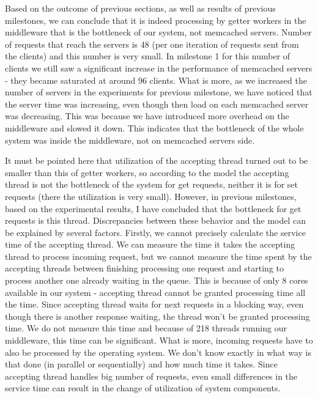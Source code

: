 \documentclass[11pt]{article}
\begin{document}
Based on the outcome of previous sections, as well as results of previous milestones, we can conclude that it is indeed processing by getter workers in the middleware that is the bottleneck of our system, not memcached servers. Number of requests that reach the servers is 48 (per one iteration of requests sent from the clients) and this number is very small. In milestone 1 for this number of clients we still saw a significant increase in the performance of memcached servers - they became saturated at around 96 clients. What is more, as we increased the number of servers in the experiments for previous milestone, we have noticed that the server time was increasing, even though then load on each memcached server was decreasing. This was because we have introduced more overhead on the middleware and slowed it down. This indicates that the bottleneck of the whole system was inside the middleware, not on memcached servers side.

It must be pointed here that utilization of the accepting thread turned out to be smaller than this of getter workers, so according to the model the accepting thread is not the bottleneck of the system for get requests, neither it is for set requests (there the utilization is very small). However, in previous milestones, based on the experimental results, I have concluded that the bottleneck for get requests is this thread. 
Discrepancies between these behavior and the model can be explained by several factors. Firstly, we cannot precisely calculate the service time of the accepting thread. We can measure the time it takes the accepting thread to process incoming request, but we cannot measure the time spent by the accepting threads between finishing processing one request and starting to process another one already waiting in the queue. This is because of only 8 cores available in our system - accepting thread cannot be granted processing time all the time. Since accepting thread waits for next requests in a blocking way, even though there is another response waiting, the thread won't be granted processing time. We do not measure this time and because of 218 threads running our middleware, this time can be significant. What is more, incoming requests have to also be processed by the operating system. We don't know exactly in what way is that done (in parallel or sequentially) and how much time it takes. Since accepting thread handles big number of requests, even small differences in the service time can result in the change of utilization of system components. 
\end{document}

